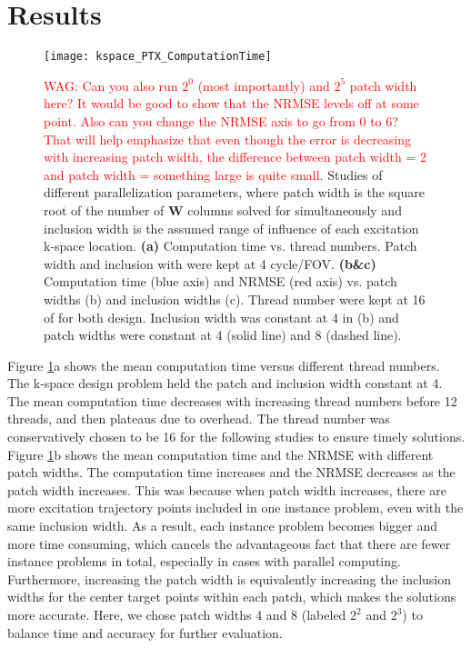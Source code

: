 \section*{Results}

\begin{figure}
	\centering
	\texttt{[image: kspace\_PTX\_ComputationTime]}
	\caption{\textcolor{red}{WAG: Can you also run $2^0$ (most importantly) and $2^5$ patch width here? It would be good to show that the NRMSE levels off at some point. Also can you change the NRMSE axis to go from 0 to 6? That will help emphasize that even though the error is decreasing with increasing patch width, 
	the difference between patch width = 2 and patch width = something large is quite small. }
	Studies of different parallelization parameters, where patch width is the square root of the number of $\mathbf{W}$ columns solved for simultaneously and inclusion width is the assumed range of influence of each excitation k-space location. \textbf{(a)} Computation time vs. thread numbers. Patch width and inclusion with were kept at 4 cycle/FOV. \textbf{(b\&c)} Computation time (blue axis) and NRMSE (red axis) vs. patch widths (b) and inclusion widths (c). Thread number were kept at 16 of for both design. Inclusion width was constant at 4 in (b) and patch widths were constant at 4 (solid line) and 8 (dashed line).}
	\label{fig:ComputationTime}
\end{figure}
Figure \ref{fig:ComputationTime}a shows the mean computation time versus different thread numbers. The k-space design problem held the patch and inclusion width constant at 4. The mean computation time decreases with increasing thread numbers before 12 threads, and then plateaus due to overhead. The thread number was conservatively chosen to be 16 for the following studies to ensure timely solutions. 
Figure \ref{fig:ComputationTime}b shows the mean computation time and the NRMSE with different patch widths. The computation time increases and the NRMSE decreases as the patch width increases. This was because when patch width increases, there are more excitation trajectory points included in one instance problem, even with the same inclusion width. As a result, each instance problem becomes bigger and more time consuming, which cancels the advantageous fact that there are fewer instance problems in total, especially in cases with parallel computing. Furthermore, increasing the patch width is equivalently increasing the inclusion widths for the center target points within each patch, which makes the solutions more accurate. Here, we chose patch widths 4 and 8 (labeled $2^2$ and $2^3$) to balance time and accuracy for further evaluation.

